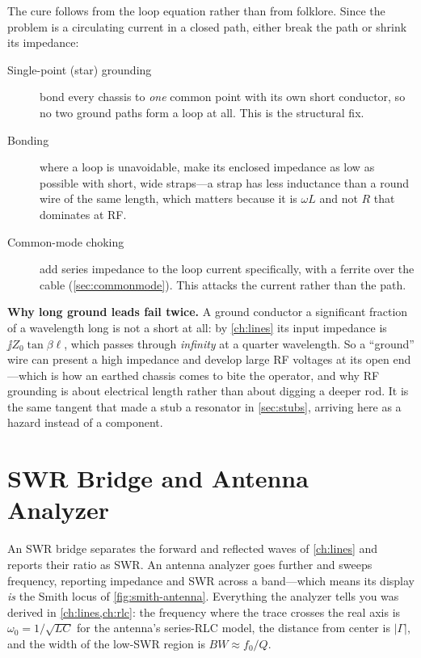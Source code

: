 The cure follows from the loop equation rather than from folklore. Since the problem
is a circulating current in a closed path, either break the path or shrink its
impedance:
\begin{description}
\item[Single-point (star) grounding] bond every chassis to \emph{one} common point
with its own short conductor, so no two ground paths form a loop at all. This is the
structural fix.
\item[Bonding] where a loop is unavoidable, make its enclosed impedance as low as
possible with short, wide straps---a strap has less inductance than a round wire of
the same length, which matters because it is \(\omega L\) and not \(R\) that
dominates at RF.
\item[Common-mode choking] add series impedance to the loop current specifically,
with a ferrite over the cable (\cref{sec:commonmode}). This attacks the current
rather than the path.
\end{description}

\begin{physicalbox}
\textbf{Why long ground leads fail twice.} A ground conductor a significant
fraction of a wavelength long is not a short at all: by \cref{ch:lines} its input
impedance is \(\jj Z_0\tan\beta\ell\), which passes through \emph{infinity} at a
quarter wavelength. So a ``ground'' wire can present a high impedance and develop
large RF voltages at its open end---which is how an earthed chassis comes to bite
the operator, and why RF grounding is about electrical length rather than about
digging a deeper rod. It is the same tangent that made a stub a resonator in
\cref{sec:stubs}, arriving here as a hazard instead of a component.
\end{physicalbox}

\section{SWR Bridge and Antenna Analyzer}
An SWR bridge separates the forward and reflected waves of \cref{ch:lines} and reports
their ratio as SWR. An antenna analyzer goes further and sweeps frequency, reporting
impedance and SWR across a band---which means its display \emph{is} the Smith locus of
\cref{fig:smith-antenna}. Everything the analyzer tells you was derived in
\cref{ch:lines,ch:rlc}: the frequency where the trace crosses the real axis is
\(\omega_0=1/\sqrt{LC}\) for the antenna's series-RLC model, the distance from center
is \(|\Gamma|\), and the width of the low-SWR region is \(BW\approx f_0/Q\).

